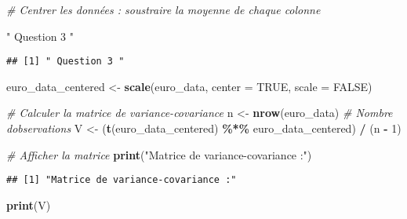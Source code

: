 \documentclass[
]{article}
\newenvironment{Shaded}{\begin{snugshade}}{\end{snugshade}}
\newcommand{\AttributeTok}[1]{\textcolor[rgb]{0.13,0.29,0.53}{#1}}
\newcommand{\CommentTok}[1]{\textcolor[rgb]{0.56,0.35,0.01}{\textit{#1}}}
\newcommand{\ConstantTok}[1]{\textcolor[rgb]{0.56,0.35,0.01}{#1}}
\newcommand{\DecValTok}[1]{\textcolor[rgb]{0.00,0.00,0.81}{#1}}
\newcommand{\FunctionTok}[1]{\textcolor[rgb]{0.13,0.29,0.53}{\textbf{#1}}}
\newcommand{\NormalTok}[1]{#1}
\newcommand{\OtherTok}[1]{\textcolor[rgb]{0.56,0.35,0.01}{#1}}
\newcommand{\SpecialCharTok}[1]{\textcolor[rgb]{0.81,0.36,0.00}{\textbf{#1}}}
\newcommand{\StringTok}[1]{\textcolor[rgb]{0.31,0.60,0.02}{#1}}
\begin{document}
\begin{Shaded}
\begin{Highlighting}[]
\CommentTok{\# Centrer les données : soustraire la moyenne de chaque colonne}

\StringTok{" Question 3 "}
\end{Highlighting}
\end{Shaded}

\begin{verbatim}
## [1] " Question 3 "
\end{verbatim}

\begin{Shaded}
\begin{Highlighting}[]
\NormalTok{euro\_data\_centered }\OtherTok{\textless{}{-}} \FunctionTok{scale}\NormalTok{(euro\_data, }\AttributeTok{center =} \ConstantTok{TRUE}\NormalTok{, }\AttributeTok{scale =} \ConstantTok{FALSE}\NormalTok{)}

\CommentTok{\# Calculer la matrice de variance{-}covariance}
\NormalTok{n }\OtherTok{\textless{}{-}} \FunctionTok{nrow}\NormalTok{(euro\_data)  }\CommentTok{\# Nombre d\textquotesingle{}observations}
\NormalTok{V }\OtherTok{\textless{}{-}}\NormalTok{ (}\FunctionTok{t}\NormalTok{(euro\_data\_centered) }\SpecialCharTok{\%*\%}\NormalTok{ euro\_data\_centered) }\SpecialCharTok{/}\NormalTok{ (n }\SpecialCharTok{{-}} \DecValTok{1}\NormalTok{)}

\CommentTok{\# Afficher la matrice}
\FunctionTok{print}\NormalTok{(}\StringTok{"Matrice de variance{-}covariance :"}\NormalTok{)}
\end{Highlighting}
\end{Shaded}

\begin{verbatim}
## [1] "Matrice de variance-covariance :"
\end{verbatim}

\begin{Shaded}
\begin{Highlighting}[]
\FunctionTok{print}\NormalTok{(V)}
\end{Highlighting}
\end{Shaded}
\end{document}
